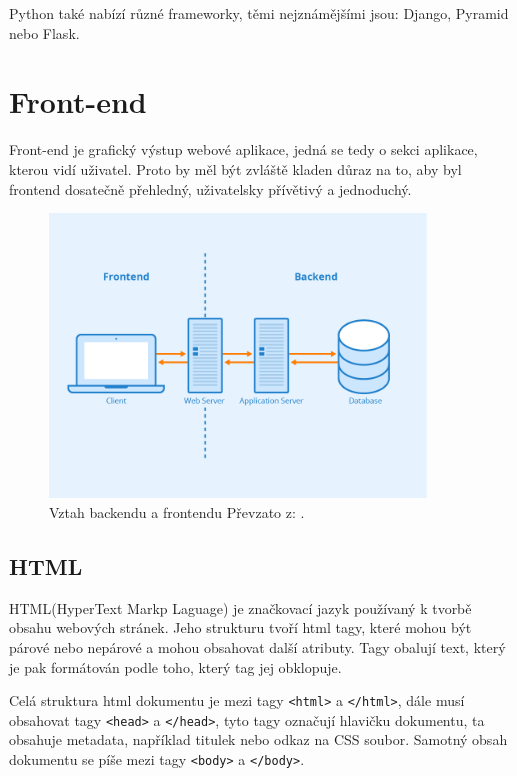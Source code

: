 Python také nabízí různé frameworky, těmi nejznámějšími jsou: Django, Pyramid nebo Flask.

\section{Front-end}

Front-end je grafický výstup webové aplikace, jedná se tedy o sekci aplikace, kterou vidí uživatel. Proto by měl být zvláště kladen důraz na to, aby byl frontend dosatečně přehledný, uživatelsky přívětivý a jednoduchý.

\begin{figure}[H]
    \centering
    \includegraphics[width=100mm]{obrazky-figures/Frontend.png}
    
    \caption{Vztah backendu a frontendu Převzato z: \cite{frontbackimage}.}
\end{figure}



\subsection{HTML}

HTML(HyperText Markp Laguage) je značkovací jazyk používaný k tvorbě obsahu webových stránek. Jeho strukturu tvoří html tagy, které mohou být párové nebo nepárové a mohou obsahovat další atributy. Tagy obalují text, který je pak formátován podle toho, který tag jej obklopuje. \cite{html}

Celá struktura html dokumentu je mezi tagy \texttt{<html>} a \texttt{</html>}, dále musí obsahovat tagy \texttt{<head>} a \texttt{</head>}, tyto tagy označují hlavičku dokumentu, ta obsahuje metadata, například titulek nebo odkaz na CSS soubor. Samotný obsah dokumentu se píše mezi tagy \texttt{<body>} a \texttt{</body>}. \cite{html}

